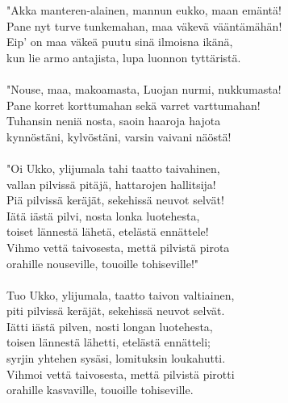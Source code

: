 "Akka manteren-alainen, mannun eukko, maan emäntä!              \\
Pane nyt turve tunkemahan, maa väkevä vääntämähän!              \\
Eip' on maa väkeä puutu sinä ilmoisna ikänä,                    \\
kun lie armo antajista, lupa luonnon tyttäristä.                \\
                                                                \\
"Nouse, maa, makoamasta, Luojan nurmi, nukkumasta!              \\
Pane korret korttumahan sekä varret varttumahan!                \\
Tuhansin neniä nosta, saoin haaroja hajota                      \\
kynnöstäni, kylvöstäni, varsin vaivani näöstä!                  \\
                                                                \\
"Oi Ukko, ylijumala tahi taatto taivahinen,                     \\
vallan pilvissä pitäjä, hattarojen hallitsija!                  \\
Piä pilvissä keräjät, sekehissä neuvot selvät!                  \\
Iätä iästä pilvi, nosta lonka luotehesta,                       \\
toiset lännestä lähetä, etelästä ennättele!                     \\
Vihmo vettä taivosesta, mettä pilvistä pirota                   \\
orahille nouseville, touoille tohiseville!"                     \\
                                                                \\
Tuo Ukko, ylijumala, taatto taivon valtiainen,                  \\
piti pilvissä keräjät, sekehissä neuvot selvät.                 \\
Iätti iästä pilven, nosti longan luotehesta,                    \\
toisen lännestä lähetti, etelästä ennätteli;                    \\
syrjin yhtehen sysäsi, lomituksin loukahutti.                   \\
Vihmoi vettä taivosesta, mettä pilvistä pirotti                 \\
orahille kasvaville, touoille tohiseville.                      \\
